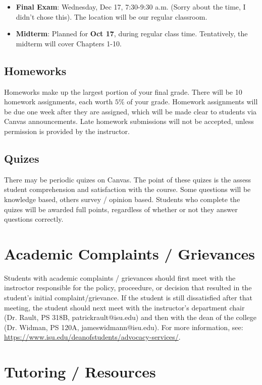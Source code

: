 \documentclass[11pt]{article}\usepackage[]{graphicx}\usepackage[]{xcolor}
\begin{document}
\begin{itemize}
  \item \textbf{Final Exam}: Wednesday, Dec 17, 7:30-9:30 a.m. (Sorry about the time, I didn't chose this). The location will be our regular classroom. 
  \item \textbf{Midterm}: Planned for {\color{blue} \textbf{Oct 17}}, during regular class time. Tentatively, the midterm will cover Chapters 1-10.
\end{itemize}

\subsection{Homeworks}

Homeworks make up the largest portion of your final grade. There will be 10 homework assignments, each worth $5\%$ of your grade.
Homework assignments will be due one week after they are assigned, which will be made clear to students via Canvas announcements.
Late homework submissions will not be accepted, unless permission is provided by the instructor.

\subsection{Quizes}

There may be periodic quizes on Canvas. The point of these quizes is the assess student comprehension and satisfaction with the course.
Some questions will be knowledge based, others survey / opinion based. 
Students who complete the quizes will be awarded full points, regardless of whether or not they answer questions correctly.

\section{Academic Complaints / Grievances}

Students with academic complaints / grievances should first meet with the instroctor responsible for the policy, proceedure, or decision that resulted in the student's initial complaint/grievance. If the student is still dissatisfied after that meeting, the student should next meet with the instructor's department chair (Dr. Rault, PS 318B, patrickrault@isu.edu) and then with the dean of the college (Dr. Widman, PS 120A, jameswidmann@isu.edu). For more information, see: \url{https://www.isu.edu/deanofstudents/advocacy-services/}.

\section{Tutoring / Resources}
\end{document}
